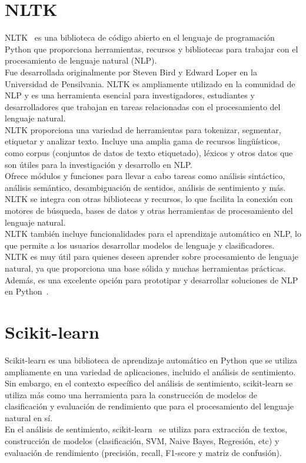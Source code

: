 \section{NLTK}
NLTK~\cite{NLTK1} es una biblioteca de código abierto en el lenguaje de programación 
Python que proporciona herramientas, recursos y bibliotecas para trabajar 
con el procesamiento de lenguaje natural (NLP).\\
Fue desarrollada originalmente por Steven Bird y Edward Loper en la Universidad de Pensilvania.
NLTK es ampliamente utilizado en la comunidad de NLP y es una herramienta esencial 
para investigadores, estudiantes y desarrolladores que trabajan en tareas relacionadas 
con el procesamiento del lenguaje natural.\\
NLTK proporciona una variedad de herramientas para tokenizar, segmentar, etiquetar y analizar texto.
Incluye una amplia gama de recursos lingüísticos, como corpus (conjuntos de datos de texto etiquetado), 
léxicos y otros datos que son útiles para la investigación y desarrollo en NLP.\\
Ofrece módulos y funciones para llevar a cabo tareas como análisis sintáctico, 
análisis semántico, desambiguación de sentidos, análisis de sentimiento y más.\\
NLTK se integra con otras bibliotecas y recursos, lo que facilita la conexión 
con motores de búsqueda, bases de datos y otras herramientas de procesamiento del lenguaje natural.\\
NLTK también incluye funcionalidades para el aprendizaje automático en NLP, 
lo que permite a los usuarios desarrollar modelos de lenguaje y clasificadores.\\
NLTK es muy útil para quienes deseen aprender sobre procesamiento de lenguaje natural, 
ya que proporciona una base sólida y muchas herramientas prácticas.\\
Además, es una excelente opción para prototipar y desarrollar soluciones de NLP en Python~\cite{NLTK2}.


\section{Scikit-learn}
Scikit-learn es una biblioteca de aprendizaje automático en Python que se utiliza 
ampliamente en una variedad de aplicaciones, incluido el análisis de sentimiento.\\ 
Sin embargo, en el contexto específico del análisis de sentimiento, 
scikit-learn se utiliza más como una herramienta para la construcción 
de modelos de clasificación y evaluación de rendimiento que para el 
procesamiento del lenguaje natural en sí.\\
En el análisis de sentimiento, scikit-learn~\cite{scikit-learn-sentiment1} se utiliza 
para extracción de textos, construcción de modelos (clasificación, SVM, Naive Bayes, Regresión, etc) y
evaluación de rendimiento (precisión, recall, F1-score y matriz de confusión).


